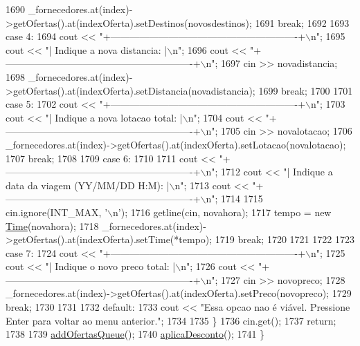 \begin{DoxyCode}
1690         \_fornecedores.at(index)->getOfertas().at(indexOferta).setDestinos(novosdestinos);
1691         \textcolor{keywordflow}{break};
1692 
1693     \textcolor{keywordflow}{case} 4:
1694         cout << \textcolor{stringliteral}{"+----------------------------------------------------------+\(\backslash\)n"};
1695         cout << \textcolor{stringliteral}{"| Indique a nova distancia:                                |\(\backslash\)n"};
1696         cout << \textcolor{stringliteral}{"+----------------------------------------------------------+\(\backslash\)n"};
1697         cin >> novadistancia;
1698         \_fornecedores.at(index)->getOfertas().at(indexOferta).setDistancia(novadistancia);
1699         \textcolor{keywordflow}{break};
1700 
1701     \textcolor{keywordflow}{case} 5:
1702         cout << \textcolor{stringliteral}{"+----------------------------------------------------------+\(\backslash\)n"};
1703         cout << \textcolor{stringliteral}{"| Indique a nova lotacao total:                            |\(\backslash\)n"};
1704         cout << \textcolor{stringliteral}{"+----------------------------------------------------------+\(\backslash\)n"};
1705         cin >> novalotacao;
1706         \_fornecedores.at(index)->getOfertas().at(indexOferta).setLotacao(novalotacao);
1707         \textcolor{keywordflow}{break};
1708 
1709     \textcolor{keywordflow}{case} 6:
1710 
1711         cout << \textcolor{stringliteral}{"+----------------------------------------------------------+\(\backslash\)n"};
1712         cout << \textcolor{stringliteral}{"| Indique a data da viagem (YY/MM/DD H:M):                 |\(\backslash\)n"};
1713         cout << \textcolor{stringliteral}{"+----------------------------------------------------------+\(\backslash\)n"};
1714 
1715         cin.ignore(INT\_MAX, \textcolor{charliteral}{'\(\backslash\)n'});
1716         getline(cin, novahora);
1717         tempo = \textcolor{keyword}{new} \hyperlink{classTime}{Time}(novahora);
1718         \_fornecedores.at(index)->getOfertas().at(indexOferta).setTime(*tempo);
1719         \textcolor{keywordflow}{break};
1720 
1721 
1722 
1723     \textcolor{keywordflow}{case} 7:
1724         cout << \textcolor{stringliteral}{"+----------------------------------------------------------+\(\backslash\)n"};
1725         cout << \textcolor{stringliteral}{"| Indique o novo preco total:                              |\(\backslash\)n"};
1726         cout << \textcolor{stringliteral}{"+----------------------------------------------------------+\(\backslash\)n"};
1727         cin >> novopreco;
1728         \_fornecedores.at(index)->getOfertas().at(indexOferta).setPreco(novopreco);
1729         \textcolor{keywordflow}{break};
1730 
1731 
1732     \textcolor{keywordflow}{default}:
1733         cout << \textcolor{stringliteral}{"Essa opcao nao é viável. Pressione Enter para voltar ao menu anterior."};
1734 
1735     \}
1736     cin.get();
1737     \textcolor{keywordflow}{return};
1738 
1739     \hyperlink{classEmpresa_a5ca8821d938f11f29558ae90913de528}{addOfertasQueue}();
1740     \hyperlink{classEmpresa_a46a4898b8ae8e09bdf656b25b8ffe99d}{aplicaDesconto}();
1741 \}
\end{DoxyCode}


